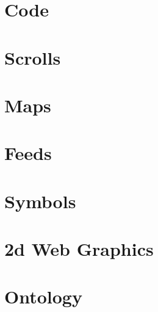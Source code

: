 \documentclass[ebook,12pt,openany,onesided]{memoir} %
\begin{document}
\chapter{Code}

\chapter{Scrolls}

\chapter{Maps}

\chapter{Feeds}

\chapter{Symbols}

\chapter{2d Web Graphics}

\chapter{Ontology}




\end{document}
